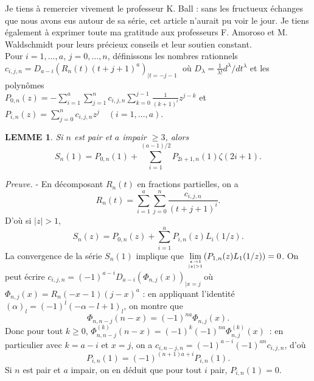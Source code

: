 \documentclass[11pt]{article}
\newcommand{\al}{\alpha}
\newcommand{\lm}{\left}
\newcommand{\rt}{\right}
\newtheorem{lem}{\rm LEMME}
\begin{document}
\noindent Je tiens \`a remercier vivement le professeur K. Ball : sans les
fructueux \'echanges que nous avons eus autour de sa s\'erie, cet article
n'aurait pu voir le jour. Je tiens \'egalement \`a exprimer toute ma
gratitude aux professeurs  F. Amoroso et M. Waldschmidt pour leurs
pr\'ecieux conseils et leur soutien constant.\\


\vspace{0.1cm}
\small
{}
Pour $i=1,\ldots,a$, $j=0,\ldots,n$, d\'efinissons les nombres rationnels
$c_{i,j,n}=D_{a-i}\lm(R_{n}(t)(t+j+1)^a\rt)_{\vert t=-j-1}\;$
o\`u $D_{\lambda}=\frac{1}{\lambda!}d^{\lambda}/dt^{\lambda}$
et les polyn\^omes \\
$P_{0,n}(z)=-
\displaystyle\sum_{i=1}^a
\displaystyle\sum_{j=1}^n c_{i,j,n}
\displaystyle\sum_{k=0}^{j-1}\frac{1}{(k+1)^i} z^{j-k}$ et
$P_{i,n}(z)=\displaystyle\sum_{j=0}^n c_{i,j,n} z^j \quad(i=1,\ldots,a)$.\\
\begin{lem}
Si $n$ est pair et $a$ impair $\geq 3$, alors
$$S_n(1)=P_{0,n}(1)+\sum_{i=1}^{(a-1)/2} P_{2i+1,n}(1)\zeta(2i+1).
$$
\end{lem}
{\sl Preuve.} -
\noindent En d\'ecomposant $R_{n}(t)$ en fractions partielles, on a
$$R_{n}(t)= \displaystyle\sum_{i=1}^a\displaystyle\sum_{j=0}^n
\displaystyle\frac{c_{i,j,n}}{(t+j+1)^i}.$$
D'o\`u si $|z|>1$,
$$
S_{n}(z)=P_{0,n}(z)+\displaystyle\sum_{i=1}^a P_{i,n}(z)L_i(1/z).
$$
\noindent La convergence de la s\'erie $S_{n}(1)$ implique que
$\displaystyle \lim_{{z\to 1\atop |z|>1}}(P_{1,n}(z)L_1(1/z))=0$.
On peut \'ecrire
$c_{i,j,n}=(-1)^{a-i}D_{a-i}(\Phi_{n,j}(x))_{\vert x=j}$ o\`u
$\Phi_{n,j}(x)=R_{n}(-x-1)(j-x)^a$ : en appliquant l'identit\'e $(\al)_l
=(-1)^l(-\al-l+1)_l$, on montre que
$$\Phi_{n,n-j}(n-x)=(-1)^{na}\Phi_{n,j}(x).$$
Donc pour tout $k\geq 0$,
$\Phi_{n,n-j}^{(k)}(n-x)=(-1)^k(-1)^{na}\Phi_{n,j}^{(k)}(x)$~:
en particulier avec $k=a-i$ et $x=j$, on a $c_{i,n-j,n}=(-1)^{a-i}(-1)^{an}
c_{i,j,n}$, d'o\`u
$$
P_{i,n}(1)=(-1)^{(n+1)a+i}P_{i,n}(1).
$$
Si $n$ est pair et $a$ impair, on en d\'eduit que pour tout $i$ pair,
$P_{i,n}(1)=0$.\\
\end{document}
